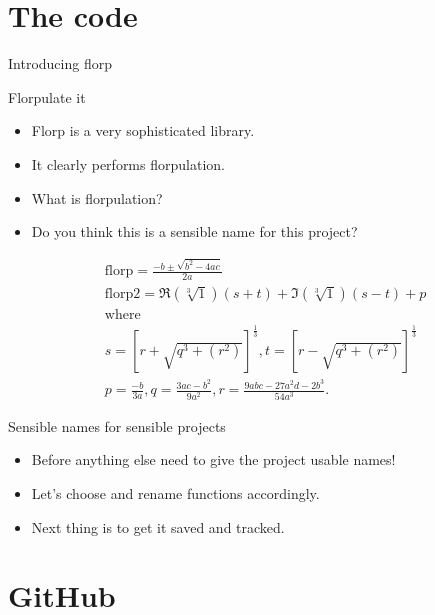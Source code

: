 \documentclass[usenames,dvipsnames]{beamer}
\newcommand{\filet}[1]{\texttt{\detokenize{#1}}}
\begin{document}
\section{The code}

\begin{frame}{Introducing florp}
    
\end{frame}

\begin{frame}{Florpulate it}
    \begin{itemize}[<+->]
        \item{}Florp is a very sophisticated library.
        \item{}It clearly performs florpulation.
        \item{}What is florpulation?
        \item{}Do you think this is a sensible name for this project?
    \end{itemize}
    \begin{align*}
        &\text{florp} = \frac{-b\pm\sqrt{b^{2} - 4ac}}{2a} \\
        &\text{florp2} = \Re{}(\sqrt[3]{1})(s + t) + \Im{}(\sqrt[3]{1})(s-t) + p \\
        &\text{where} \\
        &s = \left[r + \sqrt{q^3 + (r^2)}\right]^{\frac{1}{3}}, 
        t = \left[r - \sqrt{q^3 + (r^2)}\right]^{\frac{1}{3}}\\
        &p = \frac{-b}{3a},
        q = \frac{3ac - b^2}{9a^2}, 
        r = \frac{9abc - 27a^2d - 2b^3}{54a^3}.
    \end{align*}
\end{frame}

\begin{frame}{Sensible names for sensible projects}
    \begin{itemize}[<+->]
        \item{}Before anything else need to give the project usable names!
        \item{}Let's choose \filet{polysolve.py} and rename functions accordingly.
        \item{}Next thing is to get it saved and tracked.
    \end{itemize}
\end{frame}

\section{GitHub}
\end{document}
